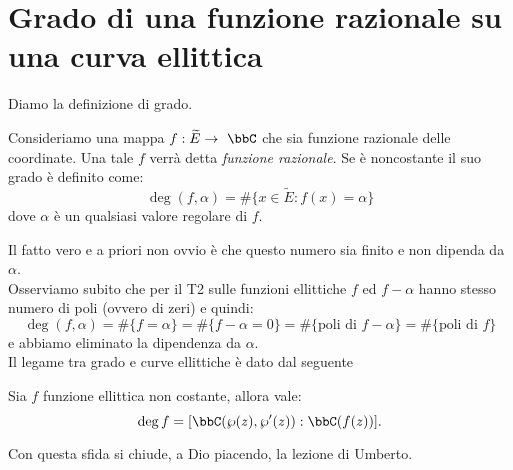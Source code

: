 \section{Grado di una funzione razionale su una curva ellittica}
Diamo la definizione di grado.
\begin{definizione}
Consideriamo una mappa $f:\widetilde{E}\rar\ \bbC$ che sia funzione razionale delle coordinate. Una tale $f$ verrà detta {\it funzione razionale}. Se è noncostante il suo grado è definito come:
$$
\deg(f,\alpha)=\#\{x\in \widetilde{E}:f(x)=\alpha\}
$$
dove $\alpha$ è un qualsiasi valore regolare di $f$.
\end{definizione}
Il fatto vero e a priori non ovvio è che questo numero sia finito e non dipenda da $\alpha$.\\
Osserviamo subito che per il T2 sulle funzioni ellittiche $f$ ed $f-\alpha$ hanno stesso numero di poli (ovvero di zeri) e quindi:
$$
\deg(f,\alpha)=\#\{f=\alpha\}=\#\{f-\alpha=0\}=\#\{\mbox{poli di } f-\alpha\}=\#\{\mbox{poli di } f\}
$$
e abbiamo eliminato la dipendenza da $\alpha$.\\
Il legame tra grado e curve ellittiche è dato dal seguente
\begin{esercizio}
Sia $f$ funzione ellittica non costante, allora vale:
$$
\deg f= [\bbC(\wp(z),\wp'(z)):\bbC(f(z))].
$$
\end{esercizio}
Con questa sfida si chiude, a Dio piacendo, la lezione di Umberto.
